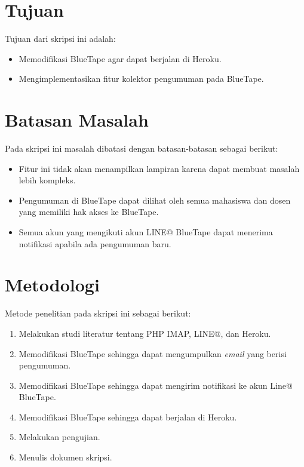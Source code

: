 \section{Tujuan}
\label{sec:tujuan}
Tujuan dari skripsi ini adalah:
\begin{itemize}
	\item Memodifikasi BlueTape agar dapat berjalan di Heroku.
	\item Mengimplementasikan fitur kolektor pengumuman pada BlueTape.
\end{itemize}

\section{Batasan Masalah}
\label{sec:batasan}
Pada skripsi ini masalah dibatasi dengan batasan-batasan sebagai berikut:
\begin{itemize}
	\item Fitur ini tidak akan menampilkan lampiran karena dapat membuat masalah lebih kompleks.
	\item Pengumuman di BlueTape dapat dilihat oleh semua mahasiswa dan dosen yang memiliki hak akses ke BlueTape.
	\item Semua akun yang mengikuti akun LINE@ BlueTape dapat menerima notifikasi apabila ada pengumuman baru.
\end{itemize}

\section{Metodologi}
\label{sec:metodepenelitian}
Metode penelitian pada skripsi ini sebagai berikut:
	\begin{enumerate}
		\item Melakukan studi literatur tentang PHP IMAP, LINE@, dan Heroku.
		\item Memodifikasi BlueTape sehingga dapat mengumpulkan \textit{email} yang berisi pengumuman.
		\item Memodifikasi BlueTape sehingga dapat mengirim notifikasi ke akun Line@ BlueTape.
		\item Memodifikasi BlueTape sehingga dapat berjalan di Heroku.
		\item Melakukan pengujian.
		\item Menulis dokumen skripsi.
	\end{enumerate}

